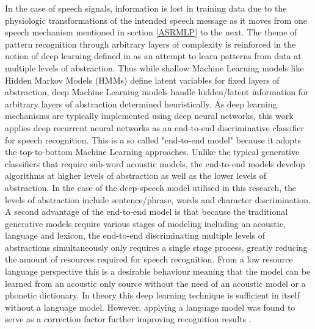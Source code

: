  In the case of speech signals, information is lost in training data due to the physiologic transformations of the intended speech message as it moves from one speech mechanism mentioned in section \ref{ASRMLP} to the next.  The theme of pattern recognition through arbitrary layers of complexity is reinforced in the notion of deep learning defined in \cite{deng2014deep} as an attempt to learn patterns from data at multiple levels of abstraction. Thus while shallow Machine Learning models like Hidden Markov Models (HMMs) define latent variables for fixed layers of abstraction, deep Machine Learning models handle hidden/latent information for arbitrary layers of abstraction determined heuristically.  As deep learning mechanisms are typically implemented using deep neural networks, this work applies deep recurrent neural networks as an end-to-end discriminative classifier for speech recognition.  This is a so called "end-to-end model" because it adopts the top-to-bottom Machine Learning approaches. Unlike the typical generative classifiers that require sub-word acoustic models, the end-to-end models develop algorithms at higher levels of abstraction as well as the lower levels of abstraction.  In the case of the deep-speech model \citep{hannun2014first} utilised in this research, the levels of abstraction include sentence/phrase, words and character discrimination. A second advantage of the end-to-end model is that because the traditional generative models require various stages of modeling including an acoustic, language and lexicon, the end-to-end discriminating multiple levels of abstractions simultaneously only requires a single stage process, greatly reducing the amount of resources required for speech recognition.  From a low resource language perspective this is a desirable behaviour meaning that the model can be learned from an acoustic only source without the need of an acoustic model or a phonetic dictionary.  In theory this deep learning technique is sufficient in itself without a language model.  However, applying a language model was found to serve as a correction factor further improving recognition results \citep{hannun2014deep}. 

